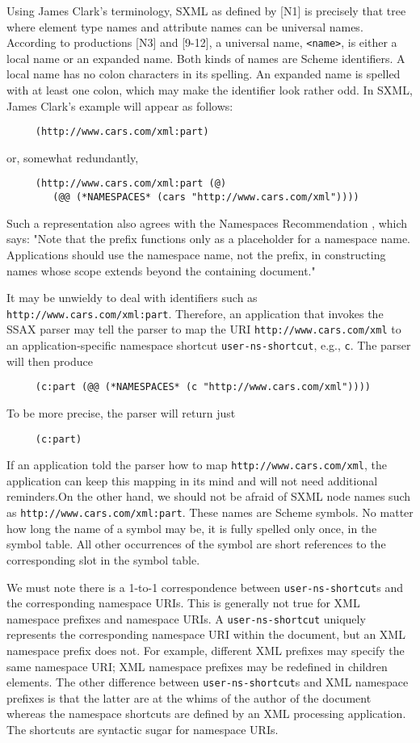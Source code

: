 \documentclass[10pt]{article}
\begin{document}
Using James Clark's terminology, SXML as defined by [N1] is
precisely that tree where element type names and attribute names can
be universal names.  According to productions [N3] and [9-12], a
universal name, \texttt{<name>}, is either a local name or an expanded
name. Both kinds of names are Scheme identifiers. A local name has no
colon characters in its spelling. An expanded name is spelled with at
least one colon, which may make the identifier look rather odd. In
SXML, James Clark's example will appear as follows:\begin{verbatim}
     (http://www.cars.com/xml:part)
\end{verbatim}
or, somewhat redundantly, \begin{verbatim}
     (http://www.cars.com/xml:part (@)
        (@@ (*NAMESPACES* (cars "http://www.cars.com/xml"))))
\end{verbatim}


Such a representation also agrees with the Namespaces Recommendation \cite{XML-Namespaces}, which says: "Note that the prefix
functions only as a placeholder for a namespace name. Applications
should use the namespace name, not the prefix, in constructing names
whose scope extends beyond the containing document."

It may be unwieldy to deal with identifiers such as \texttt{http://www.cars.com/xml:part}. Therefore, an application that
invokes the SSAX parser may tell the parser to map the URI \texttt{http://www.cars.com/xml} to an application-specific namespace shortcut \texttt{user-ns-shortcut}, e.g., \texttt{c}. The parser will then produce\begin{verbatim}
     (c:part (@@ (*NAMESPACES* (c "http://www.cars.com/xml"))))
\end{verbatim}
To be more precise, the parser will return just\begin{verbatim}
     (c:part)
\end{verbatim}
If an application told the parser how to map \texttt{http://www.cars.com/xml}, the application can keep this mapping in
its mind and will not need additional reminders.On the other hand, we should not be afraid of SXML node
names such as \texttt{http://www.cars.com/xml:part}. These names
are Scheme symbols. No matter how long the name of a symbol may be, it
is fully spelled only once, in the symbol table. All other occurrences
of the symbol are short references to the corresponding slot in
the symbol table.



We must note there is a 1-to-1 correspondence between \texttt{user-ns-shortcut}s and the corresponding namespace URIs. This is generally not true
for XML namespace prefixes and namespace URIs. A \texttt{user-ns-shortcut} uniquely represents the corresponding namespace
URI within the document, but an XML namespace prefix does not. For
example, different XML prefixes may specify the same namespace
URI; XML namespace prefixes may be redefined in children elements. The
other difference between \texttt{user-ns-shortcut}s and
XML namespace prefixes is that the latter are at the whims of the author
of the document whereas the namespace shortcuts are defined by an
XML processing application. The shortcuts are syntactic sugar for namespace URIs.
\end{document}
